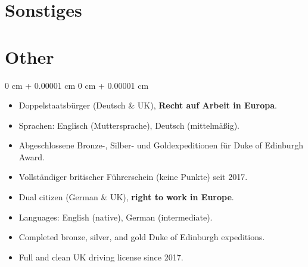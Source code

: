 \documentclass[10pt, letterpaper]{article}
\newenvironment{highlights}{
    \begin{itemize}[
        topsep=0.2 cm,
        parsep=0.2 cm,
        partopsep=0pt,
        itemsep=0.025 cm,
        leftmargin=0 cm + 10pt
    ]
}{
    \end{itemize}
}
\newenvironment{onecolentry}{
    \begin{adjustwidth}{
        0 cm + 0.00001 cm
    }{
        0 cm + 0.00001 cm
    }
}{
    \end{adjustwidth}
}
\begin{document}
        \vspace{0.15 cm}

    \ifdefined\german
    \section{Sonstiges}
    \else
    \section{Other}
    \fi

        \begin{onecolentry}
            \begin{highlights}
                \ifdefined\german
                \item Doppelstaatsbürger (Deutsch \& UK), \textbf{Recht auf Arbeit in Europa}.
                \item Sprachen: Englisch (Muttersprache), Deutsch (mittelmäßig).
                \item Abgeschlossene Bronze-, Silber- und Goldexpeditionen für Duke of Edinburgh Award.
                \item Vollständiger britischer Führerschein (keine Punkte) seit 2017.
                \else
                \item Dual citizen (German \& UK), \textbf{right to work in Europe}.
                \item Languages: English (native), German (intermediate).
                \item Completed bronze, silver, and gold Duke of Edinburgh expeditions.
                \item Full and clean UK driving license since 2017.
                \fi
            \end{highlights}
        \end{onecolentry}
\end{document}
